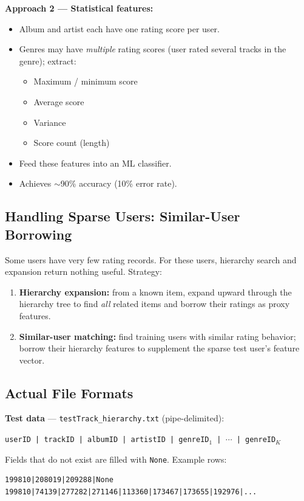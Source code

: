 \documentclass[11pt]{article}
\begin{document}
\textbf{Approach 2 --- Statistical features:}
\begin{itemize}
    \item Album and artist each have one rating score per user.
    \item Genres may have \emph{multiple} rating scores (user rated
      several tracks in the genre); extract:
      \begin{itemize}
          \item Maximum / minimum score
          \item Average score
          \item Variance
          \item Score count (length)
      \end{itemize}
    \item Feed these features into an ML classifier.
    \item Achieves $\sim$90\% accuracy (10\% error rate).
\end{itemize}

\subsection{Handling Sparse Users: Similar-User Borrowing}
Some users have very few rating records. For these users, hierarchy
search and expansion return nothing useful. Strategy:

\begin{enumerate}
    \item \textbf{Hierarchy expansion:} from a known item, expand
      upward through the hierarchy tree to find \emph{all} related
      items and borrow their ratings as proxy features.
    \item \textbf{Similar-user matching:} find training users with
      similar rating behavior; borrow their hierarchy features to
      supplement the sparse test user's feature vector.
\end{enumerate}

\subsection{Actual File Formats}

\textbf{Test data} --- \texttt{testTrack\_hierarchy.txt} (pipe-delimited):
\begin{center}
\texttt{userID | trackID | albumID | artistID | genreID$_1$ | $\cdots$ | genreID$_K$}
\end{center}
Fields that do not exist are filled with \texttt{None}.
Example rows:
\begin{verbatim}
199810|208019|209288|None
199810|74139|277282|271146|113360|173467|173655|192976|...
\end{verbatim}
\end{document}
